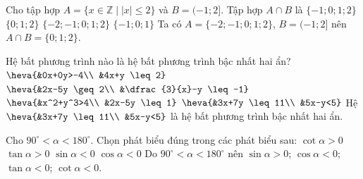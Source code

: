 \begin{ex}%
Cho tập hợp $A=\{x \in \mathbb{Z} \mid |x| \leq 2\}$ và $B=(-1 ; 2]$. Tập hợp $A \cap B$ là
	\choice
	{$\{-1 ; 0 ; 1 ; 2\}$}
	{\True $\{0 ; 1 ; 2\}$}
	{$\{-2 ;-1 ; 0 ; 1 ; 2\}$}
	{$\{-1 ; 0 ; 1\}$}
	\loigiai
	{
	Ta có $A=\{-2 ;-1 ; 0 ; 1 ; 2\}$, $B=(-1 ; 2]$ nên $A \cap B=\{0 ; 1 ; 2\}$.
	}
\end{ex}
\begin{ex}%
Hệ bất phương trình nào là hệ bất phương trình bậc nhất hai ẩn?
	\choice
	{$\heva{&0x+0y>-4\\ &4x+y \leq 2}$}
	{$\heva{&2x-5y \geq 2\\ &\dfrac{3}{x}-y \leq-1}$}
	{$\heva{&x^2+y^3>4\\ &2x-5y \leq 1}$}
	{\True $\heva{&3x+7y \leq 11\\ &5x-y<5}$}
	\loigiai
	{
	Hệ $\heva{&3x+7y \leq 11\\ &5x-y<5}$ là hệ bất phương trình bậc nhất hai ẩn.
	}
\end{ex}

\begin{ex}%
Cho $90^{\circ}<\alpha<180^{\circ}$. Chọn phát biểu đúng trong các phát biểu sau:
	\choice
	{$\cot \alpha>0$}
	{$\tan \alpha>0$}
	{$\sin \alpha<0$}
	{\True $\cos \alpha<0$}
	\loigiai
	{
	Do $90^{\circ}<\alpha<180^{\circ}$ nên $\sin \alpha>0$; $\cos \alpha<0$; $\tan \alpha<0$; $\cot \alpha<0$.
	}
\end{ex}

